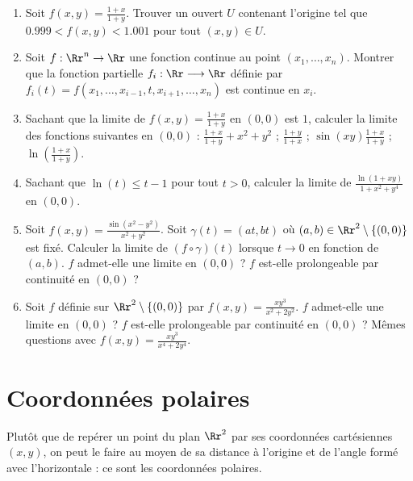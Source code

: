 \documentclass[11pt, class=report,crop=false]{standalone}
\begin{document}
\begin{miniexercices}
\sauteligne
\begin{enumerate}
  \item Soit $f(x,y) = \frac{1+x}{1+y}$. Trouver un ouvert $U$ contenant l'origine tel que 
  $0.999 < f(x,y) < 1.001$ pour tout $(x,y) \in U$.

  \item Soit $f : \Rr^n \rightarrow \Rr$ une fonction continue au point $(x_1,\ldots,x_n)$.
  Montrer que la fonction partielle $f_i : \Rr \longrightarrow \Rr$ définie par 
  $f_i(t) = f(x_1,\ldots,x_{i-1},t,x_{i+1},\ldots,x_n)$ est continue en $x_i$.
  
  \item Sachant que la limite de $f(x,y) = \frac{1+x}{1+y}$ en $(0,0)$ est $1$, calculer la limite des fonctions suivantes en $(0,0)$ : $\frac{1+x}{1+y}+ x^2+y^2$ ; $\frac{1+y}{1+x}$ ;   $\sin(xy)\frac{1+x}{1+y}$ ; $\ln\left(\frac{1+x}{1+y}\right)$.
  
  \item Sachant que $\ln(t) \le t-1$ pour tout $t>0$, calculer la limite de $\frac{\ln(1+xy)}{1+x^2+y^4}$ en $(0,0)$. 
  
  \item Soit $f(x,y)= \frac{\sin(x^2-y^2)}{x^2+y^2}$. Soit $\gamma(t) = (at,bt)$ où $(a,b) \in \Rr^2\setminus \{(0,0)\}$ est fixé. Calculer la limite de $(f \circ \gamma)(t)$ lorsque $t\to0$ en fonction de $(a,b)$. $f$ admet-elle une limite en $(0,0)$ ?  $f$ est-elle prolongeable par continuité en $(0,0)$ ? 
  
  
  \item Soit $f$ définie sur $\Rr^2\setminus \{ (0,0) \}$ par 
  $f(x,y) = \frac{xy^3}{x^2+2y^2}$. 
  $f$ admet-elle une limite en $(0,0)$ ? 
  $f$ est-elle prolongeable par continuité en $(0,0)$ ? 
  Mêmes questions avec $f(x,y)=\frac{xy^3}{x^4+2y^4}$.
  
\end{enumerate}
\end{miniexercices}



\section{Coordonnées polaires}


Plutôt que de repérer un point du plan $\Rr^2$ par ses coordonnées cartésiennes $(x,y)$, 
on peut le faire au moyen de sa distance à l'origine et de l'angle formé avec l'horizontale : ce sont les coordonnées polaires.
\end{document}

